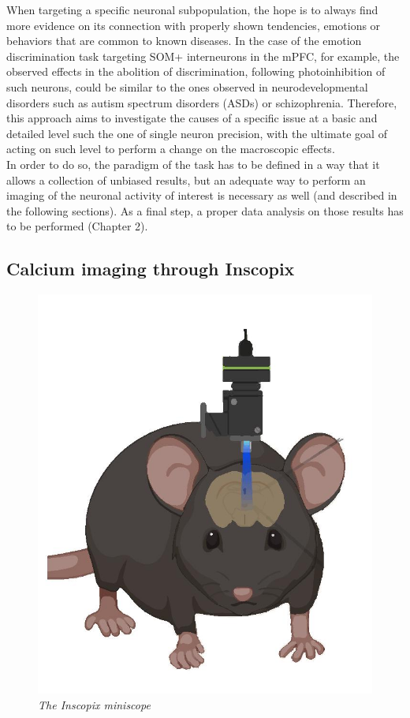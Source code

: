 \documentclass[a4paper]{article}
\begin{document}
When targeting a specific neuronal subpopulation, the hope is to always find  more evidence on its connection with  properly shown tendencies, emotions or behaviors that are common to known diseases. In the case of the emotion discrimination task targeting SOM+ interneurons in the mPFC, for example, the observed effects in the abolition of discrimination, following photoinhibition of such neurons, could be similar to the ones observed in neurodevelopmental disorders such as autism spectrum disorders (ASDs) or schizophrenia. Therefore, this approach aims to investigate the causes of a specific issue at a basic and detailed level such the one of single neuron precision, with the ultimate goal of acting on such level to perform a change on the macroscopic effects.\\
In order to do so, the paradigm of the task has to be defined in a way that it allows a collection of unbiased results, but an adequate way to perform an imaging of the neuronal activity of interest is necessary as well (and described in the following sections). As a final step, a proper data analysis on those results has to be performed (Chapter 2).


\subsection{Calcium imaging through Inscopix}



\begin{figure}[H]
	\begin{center}
		\includegraphics[scale=.35]{Inscopix.jpg} 
	\end{center} 
	\caption{\textit{The Inscopix miniscope}}
	
\end{figure}
\end{document}
